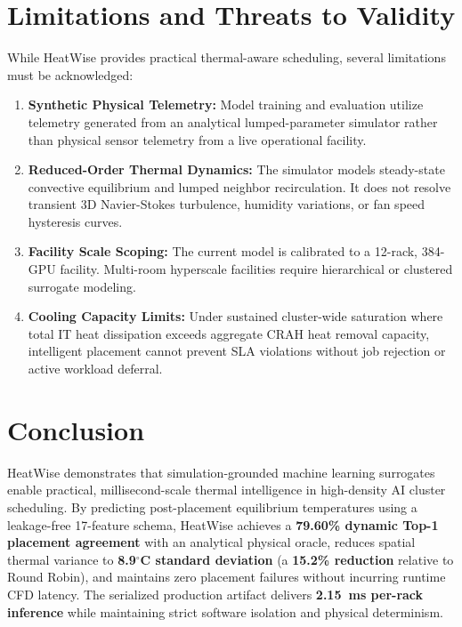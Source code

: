 \documentclass[conference,10pt]{IEEEtran}
\begin{document}
\vspace{-4pt}
\section{Limitations and Threats to Validity}
\label{sec:limitations}
While HeatWise provides practical thermal-aware scheduling, several limitations must be acknowledged:
\begin{enumerate}\setlength{\itemsep}{0pt}\setlength{\parsep}{0pt}\setlength{\parskip}{0pt}
    \item \textbf{Synthetic Physical Telemetry:} Model training and evaluation utilize telemetry generated from an analytical lumped-parameter simulator rather than physical sensor telemetry from a live operational facility.
    \item \textbf{Reduced-Order Thermal Dynamics:} The simulator models steady-state convective equilibrium and lumped neighbor recirculation. It does not resolve transient 3D Navier-Stokes turbulence, humidity variations, or fan speed hysteresis curves.
    \item \textbf{Facility Scale Scoping:} The current model is calibrated to a 12-rack, 384-GPU facility. Multi-room hyperscale facilities require hierarchical or clustered surrogate modeling.
    \item \textbf{Cooling Capacity Limits:} Under sustained cluster-wide saturation where total IT heat dissipation exceeds aggregate CRAH heat removal capacity, intelligent placement cannot prevent SLA violations without job rejection or active workload deferral.
\end{enumerate}

\balance

\vspace{-4pt}
\section{Conclusion}
\label{sec:conclusion}
HeatWise demonstrates that simulation-grounded machine learning surrogates enable practical, millisecond-scale thermal intelligence in high-density AI cluster scheduling. By predicting post-placement equilibrium temperatures using a leakage-free 17-feature schema, HeatWise achieves a \textbf{79.60\% dynamic Top-1 placement agreement} with an analytical physical oracle, reduces spatial thermal variance to \textbf{8.9$^\circ$C standard deviation} (a \textbf{15.2\% reduction} relative to Round Robin), and maintains zero placement failures without incurring runtime CFD latency. The serialized production artifact delivers \textbf{2.15~ms per-rack inference} while maintaining strict software isolation and physical determinism.
\end{document}
